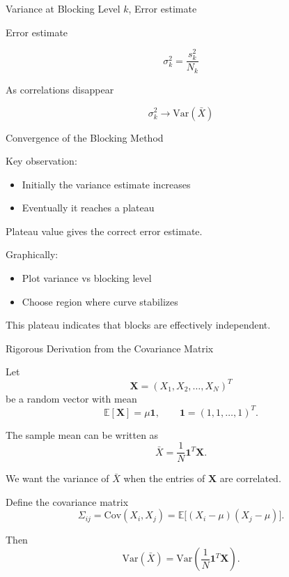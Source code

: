 \documentclass{beamer}
\begin{document}
\begin{frame}{Variance at Blocking Level $k$, Error estimate}


  Error estimate

  \[
  \sigma_k^2
  =
  \frac{s_k^2}{N_k}
  \]

  As correlations disappear

  \[
  \sigma_k^2
  \rightarrow
  \mathrm{Var}(\bar X)
  \]
\end{frame}



\begin{frame}{Convergence of the Blocking Method}

  Key observation:

  \begin{itemize}
  \item Initially the variance estimate increases
  \item Eventually it reaches a plateau
  \end{itemize}

  Plateau value gives the correct error estimate.

  Graphically:

  \begin{itemize}
  \item Plot variance vs blocking level
  \item Choose region where curve stabilizes
  \end{itemize}

  This plateau indicates that blocks are effectively independent.
\end{frame}

\begin{frame}{Rigorous Derivation from the Covariance Matrix}

Let
\[
\bm{X} = (X_1,X_2,\dots,X_N)^T
\]
be a random vector with mean
\[
\mathbb{E}[\bm{X}] = \mu \bm{1},
\qquad
\bm{1} = (1,1,\dots,1)^T .
\]

The sample mean can be written as
\[
\bar X = \frac{1}{N}\bm{1}^T \bm{X}.
\]

We want the variance of $\bar X$ when the entries of $\bm{X}$ are correlated.

Define the covariance matrix
\[
\Sigma_{ij} = \mathrm{Cov}(X_i,X_j)
= \mathbb{E}\big[(X_i-\mu)(X_j-\mu)\big].
\]

Then
\[
\mathrm{Var}(\bar X)
=
\mathrm{Var}\left(\frac{1}{N}\bm{1}^T\bm{X}\right).
\]
\end{frame}
\end{document}
